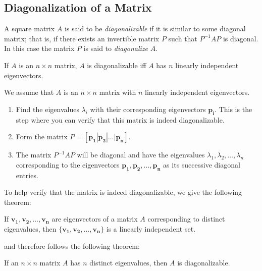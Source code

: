 \documentclass{report}
\begin{document}
		\subsection{Diagonalization of a Matrix}
			\begin{defn}[Diagonalizablility]
				A square matrix $A$ is said to be \emph{diagonalizable} if it is similar to some diagonal matrix; that is, if there exists an invertible matrix $P$ such that $P^{-1}AP$ is diagonal. In this case the matrix $P$ is said to \emph{diagonalize} $A$.
			\end{defn}
			
			\begin{thm}
				If $A$ is an $n \times n$ matrix, $A$ is diagonalizable iff $A$ has $n$ linearly independent eigenvectors.
			\end{thm}
			
			\begin{mthd}
				We assume that $A$ is an $n \times n$ matrix with $n$ linearly independent eigenvectors.
				\begin{enumerate}
					\item Find the eigenvalues $\lambda_i$ with their corresponding eigenvectors $\bm{p_i}$. This is the step where you can verify that this matrix is indeed diagonalizable.
					\item Form the matrix $P=[\bm{p_1} | \bm{p_2} | \dots | \bm{p_n}]$.
					\item The matrix $P^{-1}AP$ will be diagonal and have the eigenvalues $\lambda_1, \lambda_2, \dots, \lambda_n$ corresponding to the eigenvectors $\bm{p_1},\bm{p_2},\dots,\bm{p_n}$ as its successive diagonal entries.
				\end{enumerate}
			\end{mthd}
			
			To help verify that the matrix is indeed diagonalizable, we give the following theorem:
			
			\begin{thm}
				If $\bm{v_1},\bm{v_2},\dots,\bm{v_n}$ are eigenvectors of a matrix $A$ corresponding to distinct eigenvalues, then $\{\bm{v_1},\bm{v_2},\dots,\bm{v_n}\}$ is a linearly independent set.
			\end{thm}
			
			and therefore follows the following theorem:
			
			\begin{thm}
				If an $n \times n$ matrix $A$ has $n$ distinct eigenvalues, then $A$ is diagonalizable.
			\end{thm}
		
\end{document}

